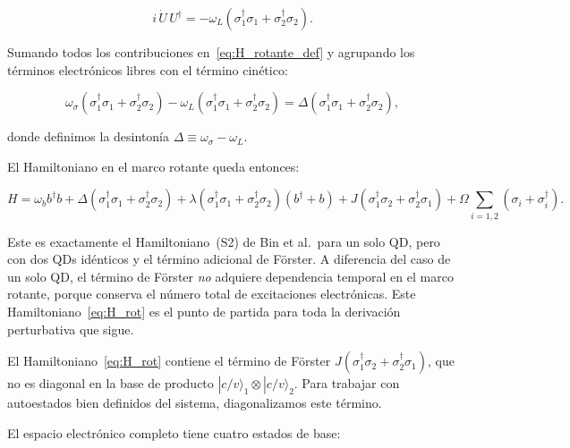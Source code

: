 \documentclass[12pt]{article}
\begin{document}
	\begin{equation}
		i\,\dot{U}\,U^\dagger = -\omega_L\!\left(\sigma_1^\dagger\sigma_1 +
		\sigma_2^\dagger\sigma_2\right).
	\end{equation}
	
	\medskip
	\noindent
	Sumando todos los contribuciones en~\eqref{eq:H_rotante_def} y agrupando los
	t\'erminos electr\'onicos libres con el t\'ermino cin\'etico:
	
	\begin{equation}
		\omega_\sigma\!\left(\sigma_1^\dagger\sigma_1 +
		\sigma_2^\dagger\sigma_2\right)
		- \omega_L\!\left(\sigma_1^\dagger\sigma_1 +
		\sigma_2^\dagger\sigma_2\right)
		= \Delta\!\left(\sigma_1^\dagger\sigma_1 + \sigma_2^\dagger\sigma_2\right),
	\end{equation}
	
	donde definimos la desinton\'ia $\Delta \equiv \omega_\sigma - \omega_L$.
	
	\medskip
	\noindent
	El Hamiltoniano en el marco rotante queda entonces:
	
	\begin{equation}
		\boxed{
			H = \omega_b b^\dagger b
			+ \Delta\!\left(\sigma_1^\dagger\sigma_1 + \sigma_2^\dagger\sigma_2\right)
			+ \lambda\!\left(\sigma_1^\dagger\sigma_1 + \sigma_2^\dagger\sigma_2\right)
			(b^\dagger + b)
			+ J\!\left(\sigma_1^\dagger\sigma_2 + \sigma_2^\dagger\sigma_1\right)
			+ \Omega\sum_{i=1,2}\!\left(\sigma_i + \sigma_i^\dagger\right).
		}
		\label{eq:H_rot}
	\end{equation}
	
	Este es exactamente el Hamiltoniano~(S2) de Bin et al.\ para un solo QD, pero
	con dos QDs id\'enticos y el t\'ermino adicional de F\"orster. A diferencia
	del caso de un solo QD, el t\'ermino de F\"orster \emph{no} adquiere
	dependencia temporal en el marco rotante, porque conserva el n\'umero total de
	excitaciones electr\'onicas. Este Hamiltoniano~\eqref{eq:H_rot} es el punto de
	partida para toda la derivaci\'on perturbativa que sigue.
	
	El Hamiltoniano~\eqref{eq:H_rot} contiene el t\'ermino de F\"orster
	$J(\sigma_1^\dagger\sigma_2 + \sigma_2^\dagger\sigma_1)$, que no es diagonal
	en la base de producto $|c/v\rangle_1 \otimes |c/v\rangle_2$. Para trabajar
	con autoestados bien definidos del sistema, diagonalizamos este t\'ermino.
	
	\medskip
	\noindent
	El espacio electr\'onico completo tiene cuatro estados de base:
	
\end{document}
